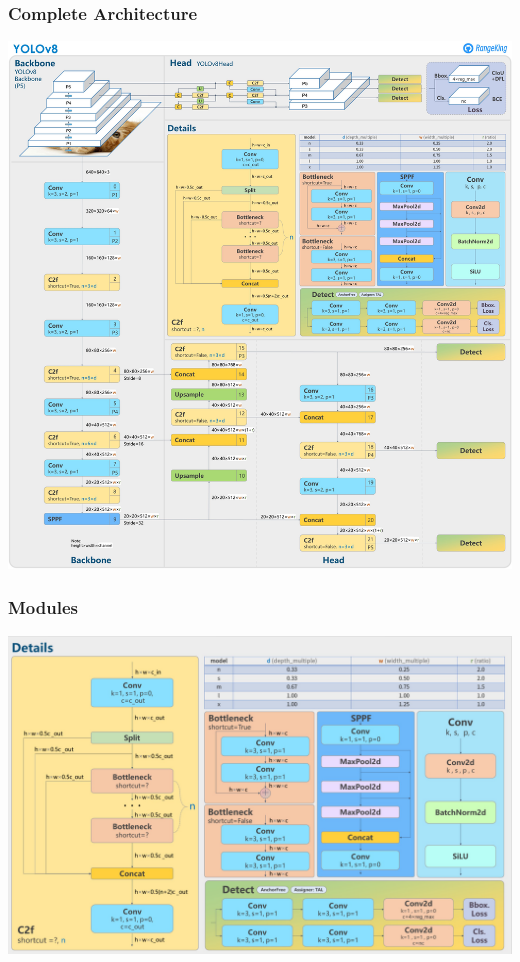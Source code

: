 \documentclass[serif]{beamer}  %
\begin{document}
\begin{frame}
\frametitle{Complete Architecture}
\centering
\includegraphics[height=0.85\textheight,keepaspectratio]{images/YOLO_architecture.jpg}
\end{frame}

\begin{frame}
\frametitle{Modules}
\centering
\includegraphics[width=1\linewidth,keepaspectratio]{images/module_details.png}
\end{frame}
\end{document}
